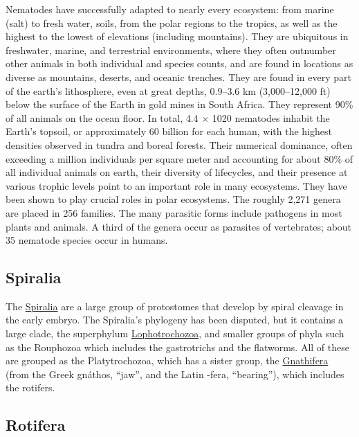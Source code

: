 Nematodes have successfully adapted to nearly every ecosystem: from marine (salt) to fresh water, soils, from the polar regions to the tropics, as well as the highest to the lowest of elevations (including mountains). They are ubiquitous in freshwater, marine, and terrestrial environments, where they often outnumber other animals in both individual and species counts, and are found in locations as diverse as mountains, deserts, and oceanic trenches. They are found in every part of the earth's lithosphere, even at great depths, 0.9--3.6 km (3,000--12,000 ft) below the surface of the Earth in gold mines in South Africa. They represent 90\% of all animals on the ocean floor. In total, 4.4 × 1020 nematodes inhabit the Earth's topsoil, or approximately 60 billion for each human, with the highest densities observed in tundra and boreal forests. Their numerical dominance, often exceeding a million individuals per square meter and accounting for about 80\% of all individual animals on earth, their diversity of lifecycles, and their presence at various trophic levels point to an important role in many ecosystems. They have been shown to play crucial roles in polar ecosystems. The roughly 2,271 genera are placed in 256 families. The many parasitic forms include pathogens in most plants and animals. A third of the genera occur as parasites of vertebrates; about 35 nematode species occur in humans.

\hypertarget{spiralia}{%
\subsection{Spiralia}\label{spiralia}}

The \href{https://en.wikipedia.org/wiki/Spiralia}{Spiralia} are a large group of protostomes that develop by spiral cleavage in the early embryo. The Spiralia's phylogeny has been disputed, but it contains a large clade, the superphylum \href{https://en.wikipedia.org/wiki/Lophotrochozoa}{Lophotrochozoa}, and smaller groups of phyla such as the Rouphozoa which includes the gastrotrichs and the flatworms. All of these are grouped as the Platytrochozoa, which has a sister group, the \href{https://en.wikipedia.org/wiki/Gnathifera_(clade)}{Gnathifera} (from the Greek gnáthos, ``jaw'', and the Latin -fera, ``bearing''), which includes the rotifers.

\hypertarget{rotifera}{%
\subsection{Rotifera}\label{rotifera}}


